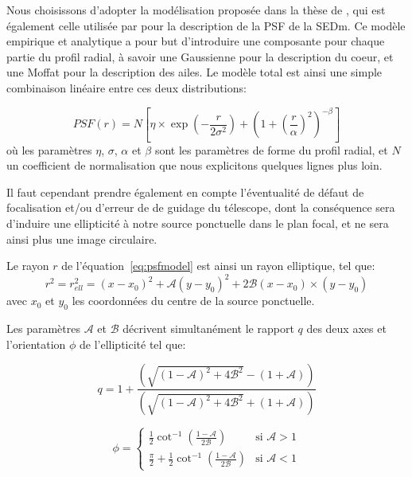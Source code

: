 \documentclass[../main/main.tex]{subfiles}
\begin{document}
Nous choisissons d'adopter la modélisation proposée dans la thèse de
\citet{Butonthese}, qui est également celle utilisée par \citet{pysedm}
pour la description de la PSF de la SEDm. Ce modèle empirique et
analytique a pour but d'introduire une composante pour chaque partie du
profil radial, à savoir une Gaussienne pour la description du coeur, et
une Moffat pour la description des ailes. Le modèle total est ainsi une
simple combinaison linéaire entre ces deux distributions:

\begin{equation}
  \label{eq:psfmodel}
  PSF(r) = N\left[\eta\times\exp\left(- \frac{r}{2\sigma^{2}}\right) +
    \left( 1+\left( \frac{r}{\alpha}\right)^{2}\right)^{-\beta} \right]
\end{equation}
où les paramètres $\eta$, $\sigma$, $\alpha$ et $\beta$ sont les paramètres
de forme du profil radial, et $N$ un coefficient de normalisation que
nous explicitons quelques lignes plus loin.

Il faut cependant prendre également en compte
l'éventualité de défaut de focalisation et/ou d'erreur de de guidage du télescope, dont la conséquence sera
d'induire une ellipticité à notre source ponctuelle dans le plan focal,
et ne sera ainsi plus une image circulaire.

Le rayon $r$ de l'équation~\ref{eq:psfmodel} est ainsi un rayon
elliptique, tel que:
\begin{equation}
  \label{eq:ellipticity}
  r^{2}=r_{ell}^{2}=(x-x_{0})^{2}+\mathcal{A}(y-y_{0})^{2}+2\mathcal{B}(x-x_{0})\times(y-y_{0})
\end{equation}
avec $x_{0}$ et $y_{0}$ les coordonnées du centre de la source
ponctuelle. 

Les paramètres $\mathcal{A}$ et $\mathcal{B}$ décrivent simultanément le
rapport $q$ des deux axes et l'orientation $\phi$ de l'ellipticité tel
que:

\begin{equation}
  \label{eq:axesratioellipse}
  q=1+\frac{\left( \sqrt{(1-\mathcal{A})^{2}+4\mathcal{B}^{2}}-(1+\mathcal{A})\right)}{\left( \sqrt{(1-\mathcal{A})^{2}+4\mathcal{B}^{2}}+(1+\mathcal{A})\right)}
\end{equation}

\begin{equation}
  \label{eq:angleellipse}
  \phi= \left\{
    \begin{array}{ll}
        \frac{1}{2}\cot^{-1}\left(\frac{1-\mathcal{A}}{2\mathcal{B}}\right) & \mbox{si } \mathcal{A}>1 \\
         \frac{\pi}{2}+\frac{1}{2}\cot^{-1}\left(\frac{1-\mathcal{A}}{2\mathcal{B}}\right) & \mbox{si } \mathcal{A}<1 
    \end{array}
\right.
\end{equation}\\
\end{document}
